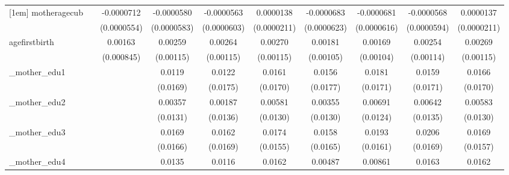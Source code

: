 \begin{table}[htbp]
\begin{tabular}{l*{9}{c}}
[1em]
motheragecub&                     &  -0.0000712         &  -0.0000580         &  -0.0000563         &   0.0000138         &  -0.0000683         &  -0.0000681         &  -0.0000568         &   0.0000137         \\
            &                     & (0.0000554)         & (0.0000583)         & (0.0000603)         & (0.0000211)         & (0.0000623)         & (0.0000616)         & (0.0000594)         & (0.0000211)         \\
[1em]
agefirstbirth&                     &     0.00163\sym{*}  &     0.00259\sym{**} &     0.00264\sym{**} &     0.00270\sym{**} &     0.00181\sym{*}  &     0.00169         &     0.00254\sym{**} &     0.00269\sym{**} \\
            &                     &  (0.000845)         &   (0.00115)         &   (0.00115)         &   (0.00115)         &   (0.00105)         &   (0.00104)         &   (0.00114)         &   (0.00115)         \\
[1em]
\_mother\_edu1&                     &                     &      0.0119         &      0.0122         &      0.0161         &      0.0156         &      0.0181         &      0.0159         &      0.0166         \\
            &                     &                     &    (0.0169)         &    (0.0175)         &    (0.0170)         &    (0.0177)         &    (0.0171)         &    (0.0171)         &    (0.0170)         \\
[1em]
\_mother\_edu2&                     &                     &     0.00357         &     0.00187         &     0.00581         &     0.00355         &     0.00691         &     0.00642         &     0.00583         \\
            &                     &                     &    (0.0131)         &    (0.0136)         &    (0.0130)         &    (0.0130)         &    (0.0124)         &    (0.0135)         &    (0.0130)         \\
[1em]
\_mother\_edu3&                     &                     &      0.0169         &      0.0162         &      0.0174         &      0.0158         &      0.0193         &      0.0206         &      0.0169         \\
            &                     &                     &    (0.0166)         &    (0.0169)         &    (0.0155)         &    (0.0165)         &    (0.0161)         &    (0.0169)         &    (0.0157)         \\
[1em]
\_mother\_edu4&                     &                     &      0.0135         &      0.0116         &      0.0162         &     0.00487         &     0.00861         &      0.0163         &      0.0162         \\

\end{tabular}
\end{table}

